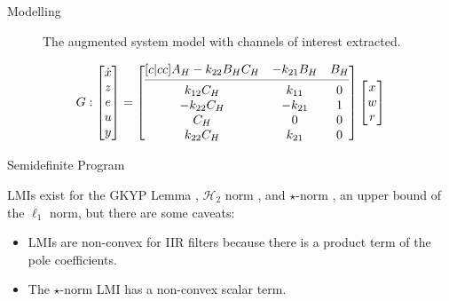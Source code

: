 \documentclass[10pt,usenames,dvipsnames]{beamer}
\begin{document}
\begin{frame}{Modelling}
\begin{figure}
	\caption{The augmented system model with channels of interest extracted.}
\end{figure} \pause
\begin{equation*}
	G:
	\begin{bmatrix}
		\dot{x} \\
		z \\
		e \\
		u \\
		y
	\end{bmatrix} =
	\begin{bmatrix}[c|cc]
		A_H - k_{22}B_HC_H & -k_{21}B_H & B_H \\
		\cmidrule(lr){1-3}
		k_{12}C_H & k_{11} & 0 \\
		-k_{22}C_H & -k_{21} & 1 \\
		C_H & 0 & 0 \\
		k_{22}C_H & k_{21} & 0
	\end{bmatrix}
	\begin{bmatrix}
		x \\
		w \\
		r
	\end{bmatrix}
\end{equation*}

\end{frame}

\begin{frame}{Semidefinite Program}

LMIs exist for the GKYP Lemma \cite{Iwasaki2005}, $\mathcal{H}_2$ norm \cite{Masubuchi1998}, and $\star$-norm \cite{Bu2000, Oberoi2005}, an upper bound of the $\ell_1$ norm, but there are some caveats: \pause
\begin{itemize}
	\item LMIs are non-convex for IIR filters because there is a product term of the pole coefficients. \pause
	\item The $\star$-norm LMI has a non-convex scalar term.
\end{itemize}

\end{frame}
\end{document}

